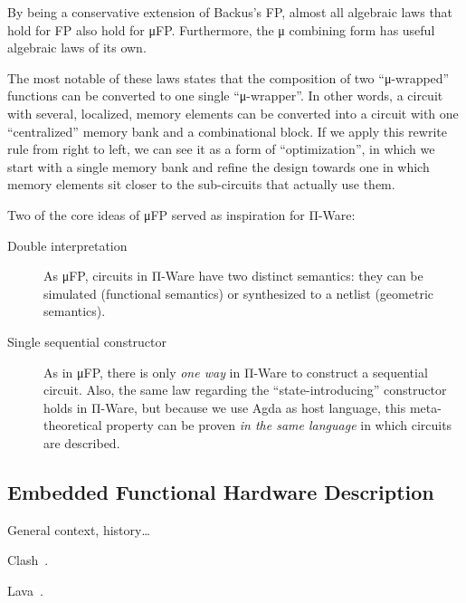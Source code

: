         By being a conservative extension of Backus's FP,
        almost all algebraic laws that hold for FP also hold for μFP.
        Furthermore, the μ combining form has useful algebraic laws of its own.

        The most notable of these laws states that the composition of two ``μ-wrapped'' functions
        can be converted to one single ``μ-wrapper''.
        In other words, a circuit with several, localized, memory elements can be converted into a circuit
        with one ``centralized'' memory bank and a combinational block.
        If we apply this rewrite rule from right to left, we can see it as a form of ``optimization'',
        in which we start with a single memory bank and refine the design towards one in which
        memory elements sit closer to the sub-circuits that actually use them.

        Two of the core ideas of μFP served as inspiration for Π-Ware:

        \begin{description}
            \item[Double interpretation] As μFP, circuits in Π-Ware have two distinct semantics:
                they can be simulated (functional semantics) or synthesized to a netlist (geometric semantics).
            \item[Single sequential constructor] As in μFP, there is only \emph{one way} in Π-Ware
                to construct a sequential circuit.
                Also, the same law regarding the ``state-introducing'' constructor holds in Π-Ware,
                but because we use Agda as host language, this meta-theoretical property can be proven
                \emph{in the same language} in which circuits are described.
        \end{description}


        \subsection{Embedded Functional Hardware Description}
        \label{subsec:embedded-functional-hardware}
            General context, history\ldots

            Clash~\cite{clash-baaij}.

            Lava~\cite{lava-1999}.


